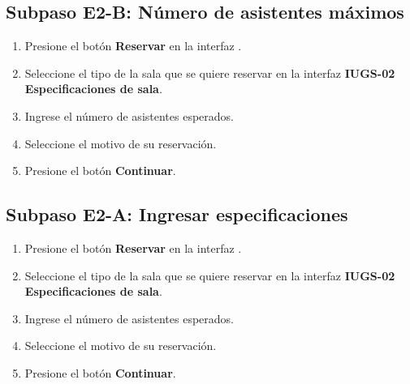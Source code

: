 \subsection{Subpaso E2-B: Número de asistentes máximos}
\begin{enumerate}
	\item Presione el botón \textbf{Reservar} en la interfaz
		.
	\item Seleccione el tipo de la sala que se quiere reservar
		en la interfaz \textbf{IUGS-02 Especificaciones de sala}.
	\item Ingrese el número de asistentes esperados.
	\item Seleccione el motivo de su reservación.
	\item Presione el botón \textbf{Continuar}.
\end{enumerate}

\subsection{Subpaso E2-A: Ingresar especificaciones}
\begin{enumerate}
	\item Presione el botón \textbf{Reservar} en la interfaz
		.
	\item Seleccione el tipo de la sala que se quiere reservar
		en la interfaz \textbf{IUGS-02 Especificaciones de sala}.
	\item Ingrese el número de asistentes esperados.
	\item Seleccione el motivo de su reservación.
	\item Presione el botón \textbf{Continuar}.
\end{enumerate}


